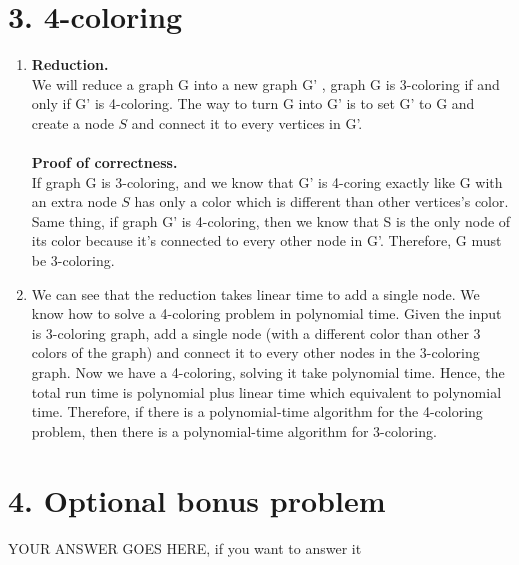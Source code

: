 \documentclass[11pt]{article}
\newenvironment{qparts}{\begin{enumerate}[{(}a{)}]}{\end{enumerate}}
\begin{document}
\section*{3. 4-coloring}
\begin{qparts}
\item
\textbf{Reduction.}\\
We will reduce a graph G into a new graph G' , graph G is 3-coloring if and only if G' is 4-coloring. The way to turn G into G' is to set G' to G and create a node $S$ and connect it to every vertices in G'.\\
\\
\textbf{Proof of correctness.}\\
If graph G is 3-coloring, and we know that G' is 4-coring exactly like G with an extra node $S$ has only a color which is different than other vertices's color.\\
Same thing, if graph G' is 4-coloring, then we know that S is the only node of its color because it's connected to every other node in G'. Therefore, G must be 3-coloring.

\item
We can see that the reduction takes linear time to add a single node. We know how to solve a 4-coloring problem in polynomial time. Given the input is 3-coloring graph, add a single node (with a different color than other 3 colors of the graph) and connect it to every other nodes in the 3-coloring graph. Now we have a 4-coloring, solving it take polynomial time. Hence, the total run time is polynomial plus linear time which equivalent to polynomial time. Therefore, if there is a polynomial-time algorithm for the 4-coloring problem, then there is a polynomial-time algorithm for 3-coloring.
\end{qparts}

\newpage
\section*{4. Optional bonus problem}
YOUR ANSWER GOES HERE, if you want to answer it
\end{document}
